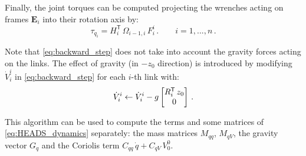Finally, the joint torques can be computed projecting the wrenches acting on frames $\mathbf{E}_i$ into their rotation axis by:
%
\begin{equation}
\tau_{q_i} = H^\mathsf{T}_{i} \, \Omega_{i-1,i} \, F^{i}_{i} \,. \qquad i = 1,...,n \,.
\label{eq:joint_force_projection}
\end{equation}

Note that \eqref{eq:backward_step} does not take into account the gravity forces acting on the links. 
%
The effect of gravity (in $-z_0$ direction) is introduced by modifying $\dot{V}^i_{i}$ in \eqref{eq:backward_step} for each $i$-th link with:
%
\begin{equation}
\dot{V}^i_{i} \leftarrow \dot{V}^i_{i} - g \begin{bmatrix}R^\mathsf{T}_{i} \, z_0 \\ 0\end{bmatrix} \,.
\label{eq:gravity_effect}
\end{equation}

This algorithm can be used to compute the terms and some matrices of \eqref{eq:HEADS_dynamics} separately: the mass matrices $M_{qq}$, $M_{qV}$, the gravity vector $G_q$ and the Coriolis term $C_{qq} \, \dot{q} + C_{qV} \, V^0_{0}$.

%
